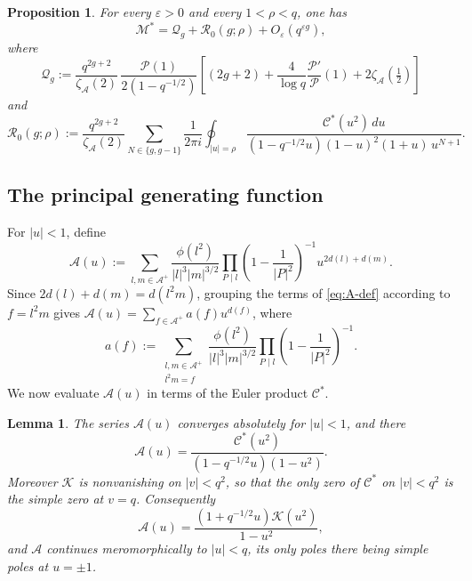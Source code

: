 \documentclass[a4paper,reqno]{amsart}
\numberwithin{equation}{section}
\newtheorem{lemma}[theorem]{Lemma}
\newtheorem{proposition}[theorem]{Proposition}
\theoremstyle{remark}
\theoremstyle{definition}
\newcommand{\A}{\mathcal{A}}
\newcommand{\zA}{\zeta_{\A}}
\begin{document}
\begin{proposition}\label{prop:principal}
For every $\varepsilon>0$ and every $1<\rho<q$, one has
\begin{equation}\label{eq:Mstar-zero-decomposition}
\mathcal M^*
=
\mathcal Q_g
+
\mathcal R_0(g;\rho)
+
O_\varepsilon\!\left(q^{\varepsilon g}\right),
\end{equation}
where
\begin{equation}\label{eq:P-final}
\mathcal Q_g
:=
\frac{q^{2g+2}}{\zA(2)}\,
\frac{\mathscr P(1)}{2(1-q^{-1/2})}
\left[
(2g+2)
+\frac{4}{\log q}\frac{\mathscr P'}{\mathscr P}(1)
+2\zA\!\left(\tfrac12 \right)
\right]
\end{equation}
and
\begin{equation}\label{eq:R0}
\mathcal R_0(g;\rho)
:=
\frac{q^{2g+2}}{\zA(2)}
\sum_{N\in\{g,g-1\}}
\frac{1}{2\pi i}
\oint_{|u|=\rho}
\frac{\mathcal C^*(u^2)\,du}
{(1-q^{-1/2}u)(1-u)^2(1+u)\,u^{N+1}}.
\end{equation}
\end{proposition}

\subsection{The principal generating function}

For $|u|<1$, define
\begin{equation}\label{eq:A-def}
\mathcal A(u)
:=
\sum_{l,m\in\A^+}
\frac{\phi(l^2)}{|l|^3|m|^{3/2}}
\prod_{P\mid l}
\left(1-\frac{1}{|P|^2}\right)^{-1}
u^{2d(l)+d(m)}.
\end{equation}
Since $2d(l)+d(m)=d(l^2m)$, grouping the terms of \eqref{eq:A-def}
according to $f=l^2m$ gives
$\mathcal A(u)=\sum_{f\in\A^+}a(f)u^{d(f)}$, where
$$
a(f):=
\sum_{\substack{l,m\in\A^+\\ l^2m=f}}
\frac{\phi(l^2)}{|l|^3|m|^{3/2}}
\prod_{P\mid l}\left(1-\frac{1}{|P|^2}\right)^{-1}.
$$
We now evaluate $\mathcal A(u)$ in terms of the Euler product $\mathcal C^*$.

\begin{lemma}
The series $\mathcal A(u)$ converges absolutely for $|u|<1$, and there
\begin{equation}\label{eq:A}
\mathcal A(u)
=
\frac{\mathcal C^*(u^2)}
{(1-q^{-1/2}u)(1-u^2)}.
\end{equation}
Moreover $\mathcal K$ is nonvanishing on $|v|<q^2$, so that the only zero of
$\mathcal C^*$ on $|v|<q^2$ is the simple zero at $v=q$. Consequently
\begin{equation}\label{eq:A-continuation}
\mathcal A(u)
=
\frac{(1+q^{-1/2}u)\mathcal K(u^2)}
{1-u^2},
\end{equation}
and $\mathcal A$ continues meromorphically to $|u|<q$, its only poles there
being simple poles at $u=\pm1$.
\end{lemma}
\end{document}
